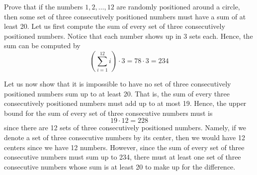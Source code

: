 \begin{hwproblem}{1}{
    Prove that if the numbers $1,2, \ldots, 12$ are randomly positioned around a 
    circle, then some set of three consecutively positioned numbers must have a 
    sum of at least 20.
  }
  Let us first compute the sum of every set of three consecutively positioned
  numbers. Notice that each number shows up in 3 sets each. Hence, the sum can
  be computed by
  \[ \left(\sum_{i=1}^{12} i\right) \cdot 3 = 78 \cdot 3 = 234 \]

  Let us now show that it is impossible to have no set of three consecutively
  positioned numbers sum up to at least 20. That is, the sum of every three
  consecutively positioned numbers must add up to at most 19. Hence, the upper
  bound for the sum of every set of three consecutive numbers must is 
  \[ 19 \cdot 12 = 228 \]
  since there are 12 sets of three consecutively positioned numbers. Namely, if
  we denote a set of three consecutive numbers by its center, then we would have
  12 centers since we have 12 numbers. However, since the sum of every set of
  three consecutive numbers must sum up to 234, there must at least one set of
  three consecutive numbers whose sum is at least 20 to make up for the 
  difference.
\end{hwproblem}
